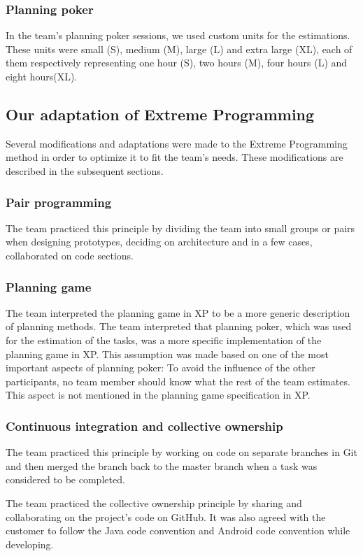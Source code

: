 \subsubsection{Planning poker}
In the team's planning poker sessions, we used custom units for the estimations. These units were small (S), medium (M), large (L) and extra large (XL), each of them respectively representing one hour (S), two hours (M), four hours (L) and eight hours(XL).

\subsection{Our adaptation of Extreme Programming}
\label{sec:adapExtremeProgr}
Several modifications and adaptations were made to the Extreme Programming method in order to optimize it to fit the team's needs. These modifications are described in the subsequent sections.

\subsubsection{Pair programming}
The team practiced this principle by dividing the team into small groups or pairs when designing prototypes, deciding on architecture and in a few cases, collaborated on code sections.

\subsubsection{Planning game}
The team interpreted the planning game in XP to be a more generic description of planning methods. The team interpreted that planning poker, which was used for the estimation of the tasks, was a more specific implementation of the planning game in XP. This assumption was made based on one of the most important aspects of planning poker: To avoid the influence of the other participants, no team member should know what the rest of the team estimates. This aspect is not mentioned in the planning game specification in XP.

\subsubsection{Continuous integration and collective ownership}
The team practiced this principle by working on code on separate branches in Git and then merged the branch back to the master branch when a task was considered to be completed.

The team practiced the collective ownership principle by sharing and collaborating on the project's code on GitHub. It was also agreed with the customer to follow the Java code convention and Android code convention while developing.

